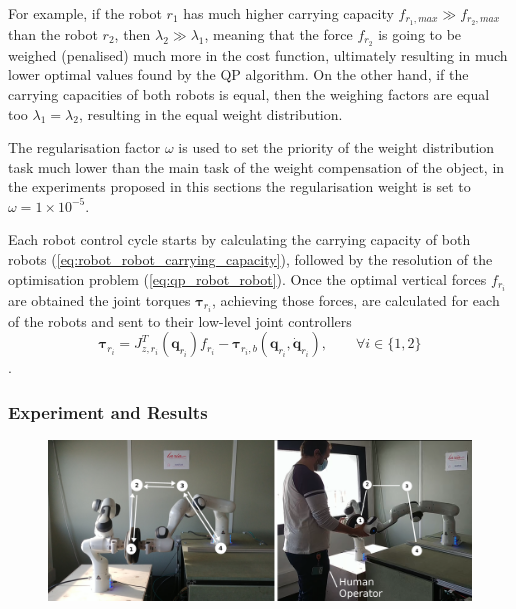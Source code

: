 For example, if the robot $r_1$ has much higher carrying capacity $f_{r_1,max}\gg f_{r_2,max}$ than the robot $r_2$, then $\lambda_2\gg\lambda_1$,  meaning that the force $f_{r_2}$ is going to be weighed (penalised) much more in the cost function, ultimately resulting in much lower optimal values found by the QP algorithm. On the other hand, if the carrying capacities of both robots is equal, then the weighing factors are equal too $\lambda_1=\lambda_2$, resulting in the equal weight distribution.  

The regularisation factor $\omega$ is used to set the priority of the weight distribution task much lower than the main task of the weight compensation of the object, in the experiments proposed in this sections the regularisation weight is set to $\omega=1\times 10^{-5}$.

Each robot control cycle starts by calculating the carrying capacity of both robots (\ref{eq:robot_robot_carrying_capacity}), followed by the resolution of the optimisation problem (\ref{eq:qp_robot_robot}). Once the optimal vertical forces $f_{r_i}$ are obtained the joint torques $\bm{\tau}_{r_i}$, achieving those forces, are calculated for each of the robots and sent to their low-level joint controllers 
\begin{equation}
    \bm{\tau}_{r_i} = J_{z,r_i}^T(\bm{q}_{r_i}){f}_{r_i} - \bm{\tau}_{r_i,b}(\bm{q}_{r_i},\dot{\bm{q}}_{r_i}), \qquad \forall i \in \{1,2\}
\end{equation}
.



\subsubsection{Experiment and Results}
\label{sec:experiment_dual_robto_carrying}
\begin{figure}[!h]
    \centering
    \includegraphics[width=\linewidth]{Papers/images/exp1_explication.png}
    \caption{}
    \label{fig:experiment1}
\end{figure}


